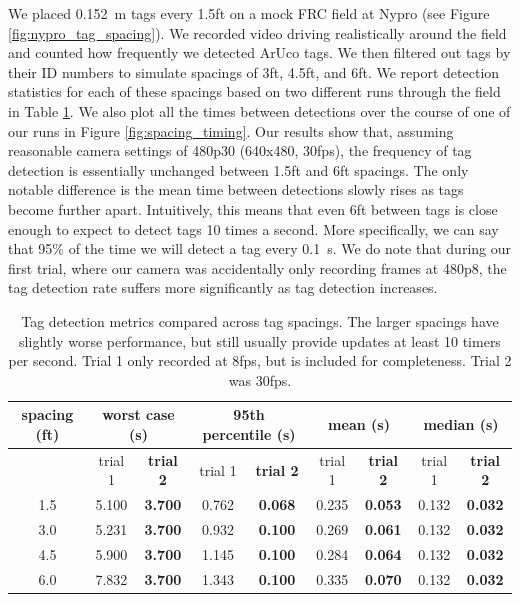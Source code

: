 \documentclass{article}
\begin{document}
    We placed \SI{0.152}{\meter} tags every 1.5ft on a mock FRC field at Nypro (see Figure \ref{fig:nypro_tag_spacing}). We recorded video driving realistically around the field and counted how frequently we detected ArUco tags. We then filtered out tags by their ID numbers to simulate spacings of 3ft, 4.5ft, and 6ft. We report detection statistics for each of these spacings based on two different runs through the field in Table \ref{table:spacing_timing}. We also plot all the times between detections over the course of one of our runs in Figure \ref{fig:spacing_timing}. Our results show that, assuming reasonable camera settings of 480p30 (640x480, 30fps), the frequency of tag detection is essentially unchanged between 1.5ft and 6ft spacings. The only notable difference is the mean time between detections slowly rises as tags become further apart. Intuitively, this means that even 6ft between tags is close enough to expect to detect tags 10 times a second. More specifically, we can say that 95\% of the time we will detect a tag every \SI{0.1}{\second}. We do note that during our first trial, where our camera was accidentally only recording frames at 480p8, the tag detection rate suffers more significantly as tag detection increases.

    \begin{table}[H]
      \centering
      \begin{tabular}{|c|c|c|c|c|c|c|c|c|} \hline
        spacing (ft) & \multicolumn{2}{c}{worst case (s)} & \multicolumn{2}{c}{95th percentile (s)} & \multicolumn{2}{c}{mean (s)} & \multicolumn{2}{c|}{median (s)} \\ \hline
            & trial 1 & \textbf{trial 2} & trial 1 & \textbf{trial 2} & trial 1 & \textbf{trial 2} & trial 1 & \textbf{trial 2} \\ \hline
        1.5 & 5.100 & \textbf{3.700} & 0.762 & \textbf{0.068} & 0.235 & \textbf{0.053} & 0.132 & \textbf{0.032} \\ \hline
        3.0 & 5.231 & \textbf{3.700} & 0.932 & \textbf{0.100} & 0.269 & \textbf{0.061} & 0.132 & \textbf{0.032} \\ \hline
        4.5 & 5.900 & \textbf{3.700} & 1.145 & \textbf{0.100} & 0.284 & \textbf{0.064} & 0.132 & \textbf{0.032} \\ \hline
        6.0 & 7.832 & \textbf{3.700} & 1.343 & \textbf{0.100} & 0.335 & \textbf{0.070} & 0.132 & \textbf{0.032} \\ \hline
      \end{tabular}
      \caption{Tag detection metrics compared across tag spacings.
      The larger spacings have slightly worse performance, but still usually provide updates at least 10 timers per second.
      Trial 1 only recorded at 8fps, but is included for completeness. Trial 2 was 30fps.}
      \label{table:spacing_timing}
    \end{table}
\end{document}
